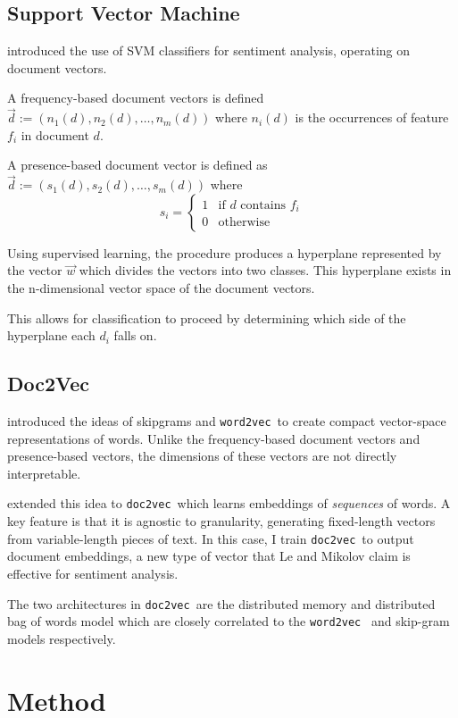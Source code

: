 \documentclass[12pt]{article}
\newcommand{\docvec}{\texttt{doc2vec}}
\newcommand{\wordvec}{\texttt{word2vec}}
\begin{document}
\begin{multicols}{2}
\subsection{Support Vector Machine}

\citet{pang2002thumbs} introduced the use of SVM classifiers for sentiment analysis, operating on document vectors.

A frequency-based document vectors is defined $\vec{d} := (n_{1}(d), n_{2}(d),\ldots,n_{m}(d))$ where $n_{i}(d)$ is the occurrences of feature $f_{i}$ in document $d$.

A presence-based document vector is defined as $\vec{d} := (s_{1}(d), s_{2}(d),\ldots,s_{m}(d))$ where
\[
s_{i} =
\left\{
	\begin{array}{ll}
		1  & \mbox{if $d$ contains $f_{i}$} \\
		0 & \mbox{otherwise}
	\end{array}
\right.
\]

Using supervised learning, the procedure produces a hyperplane represented by the vector $\vec{w}$ which divides the vectors into two classes. This hyperplane exists in the n-dimensional vector space of the document vectors.

This allows for classification to proceed by determining which side of the hyperplane each $d_{i}$ falls on.

\subsection{Doc2Vec}

\citet{mikolov2013distributed} introduced the ideas of skipgrams and \wordvec~to create compact vector-space representations of words. Unlike the frequency-based document vectors and presence-based vectors, the dimensions of these vectors are not directly interpretable.

\citet{le2014distributed} extended this idea to \docvec~which learns embeddings of \emph{sequences} of words. A key feature is that it is agnostic to granularity, generating fixed-length vectors from variable-length pieces of text. In this case, I train \docvec~to output document embeddings, a new type of vector that Le and Mikolov claim is effective for sentiment analysis.

The two architectures in \docvec~are the distributed memory and distributed bag of words model which are closely correlated to the \wordvec~ and skip-gram models respectively.

\section{Method}


\end{multicols}
\end{document}
